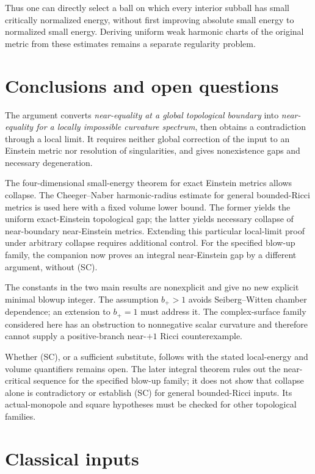 \documentclass[a4paper,11pt]{article}
\theoremstyle{paper}
\numberwithin{equation}{section}
\begin{document}
Thus one can directly select a ball on which every interior subball has small critically normalized energy, without first improving absolute small energy to normalized small energy. Deriving uniform weak harmonic charts of the original metric from these estimates remains a separate regularity problem.

\section{Conclusions and open questions}

The argument converts \emph{near-equality at a global topological boundary} into \emph{near-equality for a locally impossible curvature spectrum}, then obtains a contradiction through a local limit. It requires neither global correction of the input to an Einstein metric nor resolution of singularities, and gives nonexistence gaps and necessary degeneration.

The four-dimensional small-energy theorem for exact Einstein metrics allows collapse. The Cheeger--Naber harmonic-radius estimate for general bounded-Ricci metrics is used here with a fixed volume lower bound. The former yields the uniform exact-Einstein topological gap; the latter yields necessary collapse of near-boundary near-Einstein metrics. Extending this particular local-limit proof under arbitrary collapse requires additional control. For the specified blow-up family, the companion  now proves an integral near-Einstein gap by a different argument, without (SC).

The constants in the two main results are nonexplicit and give no new explicit minimal blowup integer. The assumption $b_+>1$ avoids Seiberg--Witten chamber dependence; an extension to $b_+=1$ must address it. The complex-surface family considered here has an obstruction to nonnegative scalar curvature and therefore cannot supply a positive-branch near-$+1$ Ricci counterexample.

Whether (SC), or a sufficient substitute, follows with the stated local-energy and volume quantifiers remains open. The later integral theorem rules out the near-critical sequence for the specified blow-up family; it does not show that collapse alone is contradictory or establish (SC) for general bounded-Ricci inputs. Its actual-monopole and square hypotheses must be checked for other topological families.

\appendix
\section{Classical inputs}
\end{document}
